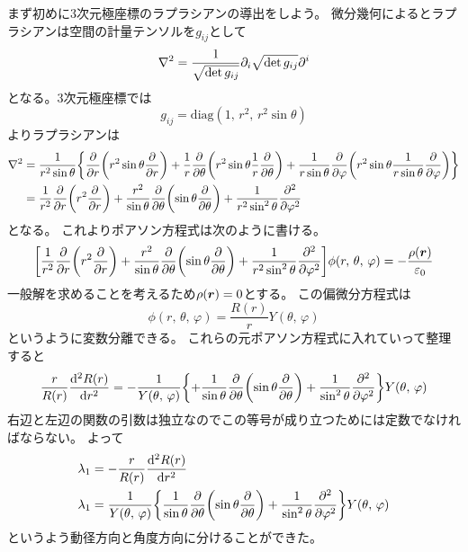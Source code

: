 \documentclass[../../master.tex]{subfiles}
\begin{document}
まず初めに3次元極座標のラプラシアンの導出をしよう。
微分幾何によるとラプラシアンは空間の計量テンソルを\(g_{ij}\)として
\begin{equation}
	\laplacian = \frac{1}{\sqrt{\det g_{ij}}}\partial_i \sqrt{\det g_{ij}}\partial^i
\end{equation}
となる。3次元極座標では
\begin{equation}
	g_{ij} = \text{diag}(1,\,r^2,\,r^2\sin\theta)
\end{equation}
よりラプラシアンは
\begin{align}
	\laplacian & = \frac{1}{r^2\sin\theta}\qty{
		\pdv{r}\qty(r^2\sin\theta\pdv{r})
		+\frac{1}{r}\pdv{\theta}\qty(r^2\sin\theta \frac{1}{r}\pdv{\theta})
		+\frac{1}{r\sin\theta}\pdv{\varphi}\qty(r^2\sin\theta \frac{1}{r\sin\theta}\pdv{\varphi})
	}                                                   \\
	           & = \frac{1}{r^2}\pdv{r}\qty(r^2\pdv{r})
	+ \frac{r^2}{\sin\theta}\pdv{\theta}\qty(\sin\theta\pdv{\theta})
	+ \frac{1}{r^2\sin^2\theta}\pdv[2]{\varphi}
\end{align}
となる。
これよりポアソン方程式は次のように書ける。
\begin{equation}
	\qty[\frac{1}{r^2}\pdv{r}\qty(r^2\pdv{r})
		+ \frac{r^2}{\sin\theta}\pdv{\theta}\qty(\sin\theta\pdv{\theta})
		+ \frac{1}{r^2\sin^2\theta}\pdv[2]{\varphi}] \phi(r,\,\theta,\,\varphi)
	= -\frac{\rho(\vb*{r})}{\varepsilon_0}
\end{equation}
一般解を求めることを考えるため\(\rho(\vb*{r})=0\)とする。
この偏微分方程式は
\begin{equation}
	\phi(r,\,\theta,\,\varphi) = \frac{R(r)}{r}Y(\theta,\,\varphi)
\end{equation}
というように変数分離できる。
これらの元ポアソン方程式に入れていって整理すると
\begin{equation}
	\frac{r}{R(r)}\dv[2]{R(r)}{r}
	= -\frac{1}{Y(\theta,\,\varphi)}\qty{
		+\frac{1}{\sin\theta}\pdv{\theta}
		\qty(\sin\theta\pdv{\theta})
		+ \frac{1}{\sin^2\theta}\pdv[2]{\varphi}}Y(\theta,\,\varphi)
\end{equation}
右辺と左辺の関数の引数は独立なのでこの等号が成り立つためには定数でなければならない。
よって
\begin{align}
	\lambda_1 & =-\frac{r}{R(r)}\dv[2]{R(r)}{r} \\
	\lambda_1 & = \frac{1}{Y(\theta,\,\varphi)}
	\qty{
		\frac{1}{\sin\theta}\pdv{\theta}
		\qty(\sin\theta\pdv{\theta})
		+ \frac{1}{\sin^2\theta}\pdv[2]{\varphi}}Y(\theta,\,\varphi)
\end{align}
というよう動径方向と角度方向に分けることができた。
\end{document}
